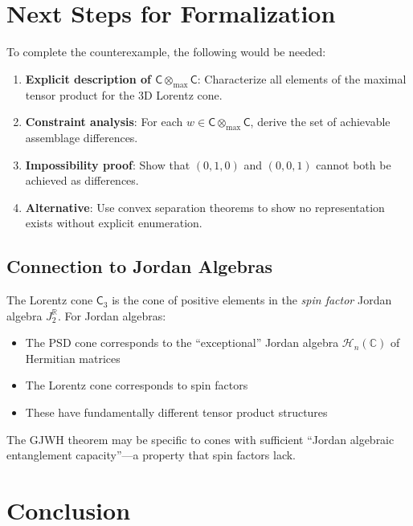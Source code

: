 \documentclass[11pt,a4paper]{article}
\theoremstyle{definition}
\newcommand{\C}{\mathsf{C}}
\newcommand{\tmax}{\otimes_{\max}}
\newcommand{\R}{\mathbb{R}}
\begin{document}
\section{Next Steps for Formalization}

To complete the counterexample, the following would be needed:

\begin{enumerate}
    \item \textbf{Explicit description of $\C \tmax \C$}: Characterize all elements of the maximal tensor product for the 3D Lorentz cone.

    \item \textbf{Constraint analysis}: For each $w \in \C \tmax \C$, derive the set of achievable assemblage differences.

    \item \textbf{Impossibility proof}: Show that $(0,1,0)$ and $(0,0,1)$ cannot both be achieved as differences.

    \item \textbf{Alternative}: Use convex separation theorems to show no representation exists without explicit enumeration.
\end{enumerate}

\subsection{Connection to Jordan Algebras}

The Lorentz cone $\C_3$ is the cone of positive elements in the \emph{spin factor} Jordan algebra $J_2^{\R}$. For Jordan algebras:
\begin{itemize}
    \item The PSD cone corresponds to the ``exceptional'' Jordan algebra $\mathcal{H}_n(\mathbb{C})$ of Hermitian matrices
    \item The Lorentz cone corresponds to spin factors
    \item These have fundamentally different tensor product structures
\end{itemize}

The GJWH theorem may be specific to cones with sufficient ``Jordan algebraic entanglement capacity''---a property that spin factors lack.

\section{Conclusion}
\end{document}
